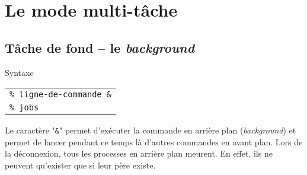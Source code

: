 %
%

\setcounter{remarque-cnt}{1}
\setcounter{example-cnt}{1}
\chapter{\label{multitask}Le mode multi-t{\^a}che}

\section{T{\^a}che de fond -- le {\sl background}}

\begin{definition}{Syntaxe}
\begin{tabular}{@{\hspace{1cm}}l}
	{\tt \% ligne-de-commande \&}\\[0.2cm]
	{\tt \% jobs}\\[0.2cm]
\end{tabular}
\end{definition}

Le caract{\`e}re "\verb=&=" permet
d'ex{\'e}cuter la commande en arri{\`e}re plan (\textsl{background}) et
permet de lancer pendant ce temps l{\`a} d'autres commandes en avant
plan. Lors de la d{\'e}connexion, tous les processes en arri{\`e}re plan
meurent. En effet, ils ne peuvent qu'exister que si leur p{\`e}re
existe.

